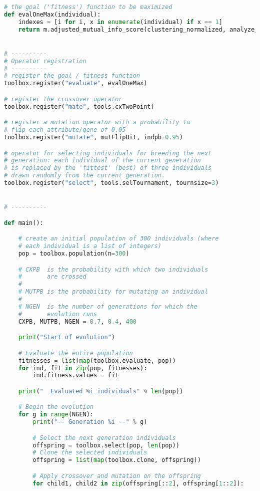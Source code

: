 \begin{lstlisting}[columns=fullflexible,language=Python]
# the goal ('fitness') function to be maximized
def evalOneMax(individual):
    indexes = [i for i, x in enumerate(individual) if x == 1]
    return m.adjusted_mutual_info_score(clustering_normalized, analyze_cluster(normalized.iloc[:, indexes], 'selected', True)) - sum(individual) / 1438.0,


# ----------
# Operator registration
# ----------
# register the goal / fitness function
toolbox.register("evaluate", evalOneMax)

# register the crossover operator
toolbox.register("mate", tools.cxTwoPoint)

# register a mutation operator with a probability to
# flip each attribute/gene of 0.05
toolbox.register("mutate", mutFlipBit, indpb=0.95)

# operator for selecting individuals for breeding the next
# generation: each individual of the current generation
# is replaced by the 'fittest' (best) of three individuals
# drawn randomly from the current generation.
toolbox.register("select", tools.selTournament, tournsize=3)


# ----------

def main():

    # create an initial population of 300 individuals (where
    # each individual is a list of integers)
    pop = toolbox.population(n=300)

    # CXPB  is the probability with which two individuals
    #       are crossed
    #
    # MUTPB is the probability for mutating an individual
    #
    # NGEN  is the number of generations for which the
    #       evolution runs
    CXPB, MUTPB, NGEN = 0.7, 0.4, 400

    print("Start of evolution")

    # Evaluate the entire population
    fitnesses = list(map(toolbox.evaluate, pop))
    for ind, fit in zip(pop, fitnesses):
        ind.fitness.values = fit

    print("  Evaluated %i individuals" % len(pop))

    # Begin the evolution
    for g in range(NGEN):
        print("-- Generation %i --" % g)

        # Select the next generation individuals
        offspring = toolbox.select(pop, len(pop))
        # Clone the selected individuals
        offspring = list(map(toolbox.clone, offspring))

        # Apply crossover and mutation on the offspring
        for child1, child2 in zip(offspring[::2], offspring[1::2]):


\end{lstlisting}
